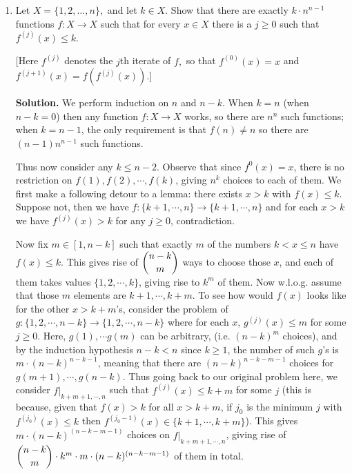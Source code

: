 \documentclass[11pt,a4paper]{article}
\newcommand{\<}{\langle}
\renewcommand{\>}{\rangle}
\begin{document}
\begin{enumerate}
	Next, given any functions $f, g$ and any $x, y\in [0, 1]$, and using $(a+b)^2\le 2(a^2+b^2)$, we have 
	\[
	(f(x)g(x) - f(y)g(y))^2 \le 2(f(x)g(x)-f(x)g(y))^2 + 2(f(x)g(y) - f(y)g(y))^2
	\]\[
	= 2f(x)^2(g(x)-g(y))^2 + 2g(y)^2(f(x)-f(y))^2
	\le 2M(f)^2(g(x)-g(y))^2 + 2M(g)^2(f(x)-f(y))^2
	\]
	Therefore 
	\[
	\text{Var}(fg)
	=\frac 12 \int_0^1 \int_0^1 (f(x)g(x) - f(y)g(y))^2 dx dy
	\]\[
	\le M(f)^2 \int_0^1 \int_0^1 (g(x) - g(y))^2 dx dy
	+M(g)^2 \int_0^1 \int_0^1 (f(x) - f(y))^2 dx dy
	=2\text{Var}(f)M(g)^2+2\text{Var}(g)M(f)^2
	\]
	as desired. 
	
	\item[\textbf{B5}] Let $X=\{1,2,\dots,n\},$ and let $k\in X.$ Show that there are exactly $k\cdot n^{n-1}$ functions $f:X\to X$ such that for every $x\in X$ there is a $j\ge 0$ such that $f^{(j)}(x)\le k.$
	
	[Here $f^{(j)}$ denotes the $j$th iterate of $f,$ so that $f^{(0)}(x)=x$ and $f^{(j+1)}(x)=f\left(f^{(j)}(x)\right).$]
	
	\textbf{Solution.} We perform induction on $n$ and $n-k$. When $k=n$ (when $n-k=0$) then any function $f:X\to X$ works, so there are $n^n$ such functions; when $k=n-1$, the only requirement is that $f(n)\neq n$ so there are $(n-1)n^{n-1}$ such functions. 
	
	Thus now consider any $k\le n-2$. Observe that since $f^{0}(x)=x$, there is no restriction on $f(1), f(2), \cdots , f(k)$, giving $n^k$ choices to each of them. We first make a following detour to a lemma: there exists $x>k$ with $f(x)\le k$. Suppose not, then we have $f:\{k+1, \cdots , n\}\to \{k+1, \cdots , n\}$ and for each $x>k$ we have $f^{(j)}(x)>k$ for any $j\ge 0$, contradiction. 
	
	Now fix $m\in [1, n-k]$ such that exactly $m$ of the numbers $k<x\le n$ have $f(x)\le k$. This gives rise of $\dbinom{n-k}{m}$ ways to choose those $x$, and each of them takes values $\{1, 2, \cdots , k\}$, giving rise to $k^m$ of them. Now w.l.o.g. assume that those $m$ elements are $k+1, \cdots , k+m$. 
	To see how would $f(x)$ looks like for the other $x>k+m$'s, consider the problem of $g:\{1, 2, \cdots , n-k\}\to \{1, 2, \cdots , n-k\}$ where for each $x$, $g^{(j)}(x)\le m$ for some $j\ge 0$. Here, $g(1), \cdots g(m)$ can be arbitrary, (i.e. $(n-k)^m$ choices), and by the induction hypothesis $n-k<n$ since $k\ge 1$, the number of such $g$'s is $m\cdot (n-k)^{n-k-1}$, meaning that there are $(n-k)^{n-k-m-1}$ choices for $g(m+1), \cdots , g(n-k)$. Thus going back to our original problem here, we consider $f|_{k+m+1, \cdots , n}$ such that $f^{(j)}(x)\le k+m$ for some $j$ (this is because, given that $f(x)>k$ for all $x>k+m$, if $j_0$ is the minimum $j$ with $f^{(j_0)}(x)\le k$ then $f^{(j_0-1)}(x)\in \{k+1, \cdots , k+m\}$). This gives $m\cdot (n-k)^{(n-k-m-1)}$ choices on $f|_{k+m+1, \cdots , n}$, giving rise of $\dbinom{n-k}{m}\cdot k^m\cdot m\cdot (n-k)^{(n-k-m-1)}$ of them in total. 
	

\end{enumerate}
\end{document}
